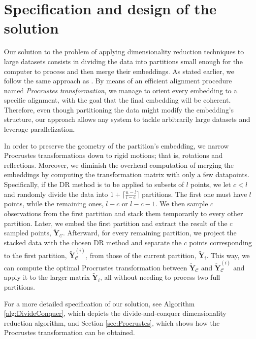 \section{Specification and design of the solution}
\label{sec:specification-and-design-of-the-solution}

Our solution to the problem of applying dimensionality reduction techniques to large datasets consists in dividing the data into partitions small enough for the computer to process and then merge their embeddings. As stated earlier, we follow the same approach as \citet{Delicado2024}. By means of an efficient alignment procedure named \textit{Procrustes transformation}, we manage to orient every embedding to a specific alignment, with the goal that the final embedding will be coherent. Therefore, even though partitioning the data might modify the embedding's structure, our approach allows any system to tackle arbitrarily large datasets and leverage parallelization.

In order to preserve the geometry of the partition's embedding, we narrow Procrustes transformations down to rigid motions; that is, rotations and reflections. Moreover, we diminish the overhead computation of merging the embeddings by computing the transformation matrix with only a few datapoints. Specifically, if the DR method is to be applied to subsets of $l$ points, we let $c<l$ and randomly divide the data into $1 + \lceil \frac{n - l}{l - c} \rceil$ partitions. The first one must have $l$ points, while the remaining ones, $l-c$ or $l-c-1$. We then sample $c$ observations from the first partition and stack them temporarily to every other partition. Later, we embed the first partition and extract the result of the $c$ sampled points, $\mathbf{\tilde{Y}}_{\mathcal{C}}$. Afterward, for every remaining partition, we project the stacked data with the chosen DR method and separate the $c$ points corresponding to the first partition, $\mathbf{\tilde{Y}}_{\mathcal{C}}^{(i)}$, from those of the current partition, $\mathbf{\tilde{Y}}_{i}$. This way, we can compute the optimal Procrustes transformation between $\mathbf{\tilde{Y}}_{\mathcal{C}}$ and $\mathbf{\tilde{Y}}_{\mathcal{C}}^{(i)}$ and apply it to the larger matrix $\mathbf{\tilde{Y}}_i$, all without needing to process two full partitions.

For a more detailed specification of our solution, see Algorithm \ref{alg:DivideConquer}, which depicts the divide-and-conquer dimensionality reduction algorithm, and Section \ref{sec:Procrustes}, which shows how the Procrustes transformation can be obtained.

